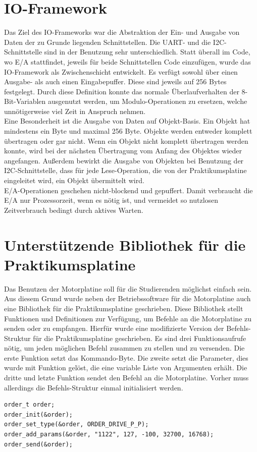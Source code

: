 \section{IO-Framework}
Das Ziel des IO-Frameworks war die Abstraktion der Ein- und Ausgabe von Daten der zu Grunde liegenden Schnittstellen.
Die UART- und die I2C-Schnittstelle sind in der Benutzung sehr unterschiedlich. Statt überall im Code, wo E/A stattfindet,
jeweils für beide Schnittstellen Code einzufügen, wurde das IO-Framework als Zwischenschicht entwickelt. Es verfügt sowohl
über einen Ausgabe- als auch einen Eingabepuffer. Diese sind jeweils auf 256 Bytes festgelegt. Durch diese Definition
konnte das normale Überlaufverhalten der 8-Bit-Variablen ausgenutzt werden, um Modulo-Operationen zu ersetzen, welche
unnötigerweise viel Zeit in Anspruch nehmen.\\
Eine Besonderheit ist die Ausgabe von Daten auf Objekt-Basis. Ein Objekt hat mindestens ein Byte und maximal 256 Byte. Objekte
werden entweder komplett übertragen oder gar nicht. Wenn ein Objekt nicht komplett übertragen werden konnte, wird bei der
nächsten Übertragung vom Anfang des Objektes wieder angefangen. Außerdem bewirkt die Ausgabe von Objekten bei Benutzung der
I2C-Schnittstelle, dass für jede Lese-Operation, die von der Praktikumsplatine eingeleitet wird, ein Objekt übermittelt wird.\\
E/A-Operationen geschehen nicht-blockend und gepuffert. Damit verbraucht die E/A nur Prozessorzeit, wenn es nötig ist, und
vermeidet so nutzlosen Zeitverbrauch bedingt durch aktives Warten.

\section{Unterstützende Bibliothek für die Praktikumsplatine}
Das Benutzen der Motorplatine soll für die Studierenden möglichst einfach sein.
Aus diesem Grund wurde neben der Betriebssoftware für die Motorplatine auch eine
Bibliothek für die Praktikumsplatine geschrieben. Diese Bibliothek stellt
Funktionen und Definitionen zur Verfügung, um Befehle an die Motorplatine zu
senden oder zu empfangen. Hierfür wurde eine modifizierte Version der
Befehls-Struktur für die Praktikumsplatine geschrieben. Es sind drei Funktionsaufrufe
nötig, um jeden möglichen Befehl zusammen zu stellen und zu versenden. Die erste
Funktion setzt das Kommando-Byte. Die zweite setzt die Parameter, dies wurde
mit Funktion gelöst, die eine variable Liste von Argumenten erhält. Die dritte und
letzte Funktion sendet den Befehl an die Motorplatine. Vorher muss allerdings die
Befehls-Struktur einmal initialisiert werden.
\begin{verbatim}
order_t order;
order_init(&order);
order_set_type(&order, ORDER_DRIVE_P_P);
order_add_params(&order, "1122", 127, -100, 32700, 16768);
order_send(&order);
\end{verbatim}
